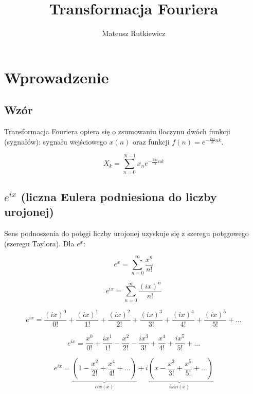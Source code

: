 \documentclass{article}
\title{Transformacja Fouriera}
\author{Mateusz Rutkiewicz}
\begin{document}
\maketitle

\Large
\section{Wprowadzenie}

\subsection{Wzór} 

Transformacja Fouriera opiera się o zsumowaniu iloczynu dwóch funkcji (sygnałów): sygnału wejściowego $x(n)$ oraz funkcji $f(n) = e^{-\frac{2\pi i}{N}nk}$.

\begin{equation}
    X_k = \sum_{n=0}^{N-1} x_n e^{-\frac{2\pi i}{N}nk}
\end{equation}{}

\subsection{$e^{ix}$ (liczna Eulera podniesiona do liczby urojonej)} 

Sens podnoszenia do potęgi liczby urojonej uzyskuje się z szeregu potęgowego (szeregu Taylora). Dla $e^x$:

\begin{equation}
    e^x = \sum_{n=0}^\infty \frac{x^n}{n!}
\end{equation}

\begin{equation}
    e^{ix} = \sum_{n=0}^\infty \frac{(ix)^n}{n!}
\end{equation}

\begin{equation}
    e^{ix} = \frac{(ix)^0}{0!} + \frac{(ix)^1}{1!} + \frac{(ix)^2}{2!} + \frac{(ix)^3}{3!} + \frac{(ix)^4}{4!} + \frac{(ix)^5}{5!} + ...
\end{equation}

\begin{equation}
    e^{ix} = \frac{x^0}{0!} + \frac{ix^1}{1!} - \frac{x^2}{2!} - \frac{ix^3}{3!} + \frac{x^4}{4!} + \frac{ix^5}{5!} + ...
\end{equation}

\begin{equation}
    e^{ix} = 
    \underbrace{(1 -\frac{x^2}{2!} + \frac{x^4}{4!} + ...)}_{cos(x)} +
    \underbrace{i(x - \frac{x^3}{3!}  + \frac{x^5}{5!} + ...)}_{isin(x)}
\end{equation}
\end{document}
